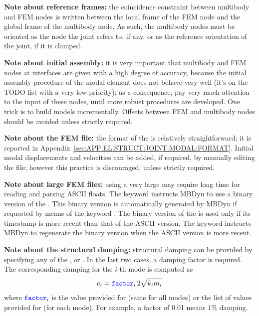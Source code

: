 \textbf{Note about reference frames:} the coincidence constraint between 
multibody and FEM nodes is written between the local frame 
of the FEM node and the global frame of the multibody node.
As such, the multibody nodes must be oriented as the 
node the  joint refers to, if any, or as the reference
orientation of the  joint, if it is clamped.

\textbf{Note about initial assembly:} it is very important that multibody 
and FEM nodes at interfaces are given with a high degree of accuracy,
because the initial assembly procedure of the modal element
does not behave very well (it's on the TODO list with a very low
priority); as a consequence, pay very much attention to the input
of these nodes, until more robust procedures are developed.
One trick is to build models incrementally.
Offsets between FEM and multibody nodes 
should be avoided unless strictly required.

\textbf{Note about the FEM file:}
the format of the  is relatively straightforward;
it is reported
in Appendix~\ref{sec:APP:EL:STRUCT:JOINT:MODAL:FORMAT}.
Initial modal displacements and velocities can be added,
if required, by manually editing the file; however this practice
is discouraged, unless strictly required.


\textbf{Note about large FEM files:}
using a very large  may require long time for
reading and parsing ASCII floats.
The keyword  instructs MBDyn to use a binary version
of the .
This binary version is automatically generated by MBDyn if requested
by means of the keyword .
The binary version of the  is used only if its
timestamp is more recent than that of the ASCII version.
The keyword  instructs MBDyn to regenerate the
binary version when the ASCII version is more recent.

\textbf{Note about the structural damping:}
structural damping can be provided by specifying any of the
,  or .
In the last two cases, a damping factor is required.
The corresponding damping for the $i$-th mode is computed as
\begin{displaymath}
	c_i = \textcolor{blue}{\texttt{factor}}_i \, 2 \sqrt{k_i m_i}
\end{displaymath}
where $\textcolor{blue}{\texttt{factor}}_i$ is the value provided
for  (same for all modes) or the list 
of values provided for  (for each mode).
For example, a factor of 0.01 means 1\% damping.

